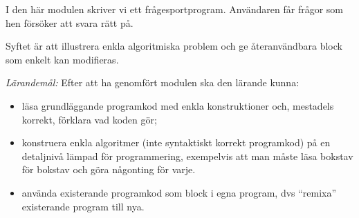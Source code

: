 
I den här modulen skriver vi ett frågesportprogram.
Användaren får frågor som hen försöker att svara rätt på.

Syftet är att illustrera enkla algoritmiska problem och ge återanvändbara block 
som enkelt kan modifieras.

\emph{Lärandemål:}
Efter att ha genomfört modulen ska den lärande kunna:
\begin{itemize}
  \item läsa grundläggande programkod med enkla konstruktioner
    och, mestadels korrekt, förklara vad koden gör;
  \item konstruera enkla algoritmer (inte syntaktiskt korrekt programkod) på en 
    detaljnivå lämpad för programmering, exempelvis att man måste läsa bokstav 
    för bokstav och göra någonting för varje.
  \item använda existerande programkod som block i egna program, dvs 
    \enquote{remixa} existerande program till nya.
\end{itemize}
